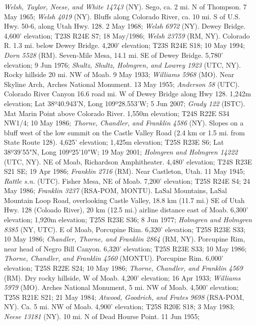 \textit{Welsh, Taylor, Neese, and White 14743} (NY).
Sego, ca. 2 mi. N of Thompson. 7 May 1965; \textit{Welsh 4019} (NY).
Bluffs along Colorado River, ca. 10 mi. S of U.S. Hwy. 50-6, along Utah Hwy.
128. 2 May 1968; \textit{Welsh 6972} (NY).
Dewey Bridge. 4,600' elevation; T23S R24E S7; 18 May/1986;
\textit{Welsh 23759} (RM, NY).
Colorado R. 1.3 mi. below Dewey Bridge. 4,200' elevation; T23S R24E S18;
10 May 1994; \textit{Dorn 5528} (RM).
Seven-Mile Mesa, 14.1 mi. SE of Dewey Bridge. 5,780' elevation; 9 Jun 1976;
\textit{Shultz, Shultz, Holmgren, and Lowrey 1923} (UTC, NY).
Rocky hillside 20 mi. NW of Moab. 9 May 1933; \textit{Williams 5968} (MO).
Near Skyline Arch, Arches National Monument. 13 May 1955;
\textit{Anderson 58} (UTC).
Colorado River Canyon 16.6 road mi. W of Dewey Bridge along Hwy 128.
1,242m elevation; Lat 38º40.943'N, Long 109º28.553'W; 5 Jun 2007;
\textit{Grady 122} (ISTC).
Mat Marin Point above Colorado River. 1,550m elevation; T24S R22E S34 NW1/4;
10 May 1986; \textit{Thorne, Chandler, and Franklin 4586} (NY).
Slopes on a bluff west of the low summit on the Castle Valley Road (2.4 km or
1.5 mi. from State Route 128). 4,625' elevation; 1,425m elevation; T25S R23E S6;
Lat 38º39'55"N, Long 109º25'10"W; 19 May 2001;
\textit{Holmgren and Holmgren 14222} (UTC, NY).
NE of Moab, Richardson Amphitheater. 4,480' elevation; T24S R23E S21 SE;
19 Apr 1986; \textit{Franklin 2716} (RM).
Near Castleton, Utah. 11 May 1945; \textit{Rattle s.n.} (UTC).
Fisher Mesa, NE of Moab. 7,200' elevation; T25S R24E S4; 24 May 1986;
\textit{Franklin 3237} (RSA-POM, MONTU).
LaSal Mountains, LaSal Mountain Loop Road, overlooking Castle Valley, 18.8 km
(11.7 mi.) SE of Utah Hwy. 128 (Coloado River), 20 km (12.5 mi.) airline
distance east of Moab. 6,300' elevation; 1,920m elevation; T25S R23E S36;
8 Jun 1977; \textit{Holmgren and Holmgren 8385} (NY, UTC).
E of Moab, Porcupine Rim. 6,320' elevation; T25S R23E S33; 10 May 1986;
\textit{Chandler, Thorne, and Franklin 2864} (RM, NY).
Porcupine Rim, near head of Negro Bill Canyon. 6,320' elevation; T25S R23E S33;
10 May 1986; \textit{Thorne, Chandler, and Franklin 4560} (MONTU).
Porcupine Rim. 6,000' elevation; T25S R22E S24; 10 May 1986;
\textit{Thorne, Chandler, and Franklin 4569} (RM).
Dry rocky hillside, W of Moab. 4,200' elevation; 16 Apr 1933;
\textit{Williams 5979} (MO).
Arches National Monument, 5 mi. NW of Moab. 4,500' elevation; T25S R21E S21;
21 May  1984; \textit{Atwood, Goodrich, and Frates 9698} (RSA-POM, NY).
Ca. 5 mi. NW of Moab. 4,900' elevation; T25S R20E S18; 3 May 1983;
\textit{Neese 13181} (NY).
10 mi. N of Dead Hourse Point. 11 Jun 1955;
